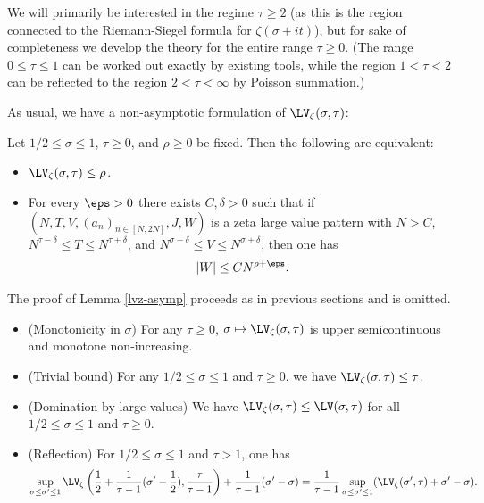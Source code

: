 
We will primarily be interested in the regime $\tau \geq 2$ (as this is the region connected to the Riemann-Siegel formula for $\zeta(\sigma+it)$), but for sake of completeness we develop the theory for the entire range $\tau \geq 0$.  (The range $0 \leq \tau \leq 1$ can be worked out exactly by existing tools, while the region $1 < \tau < 2$ can be reflected to the region $2 < \tau < \infty$ by Poisson summation.)

As usual, we have a non-asymptotic formulation of $\LV_\zeta(\sigma,\tau)$:

\begin{lemma}\label{lvz-asymp} Let $1/2 \leq \sigma \leq 1$, $\tau \geq 0$, and $\rho \geq 0$  be fixed.  Then the following are equivalent:
    \begin{itemize}
        \item[(i)] $\LV_\zeta(\sigma,\tau) \leq \rho$.
        \item[(ii)] For every $\eps>0$ there exists $C,\delta>0$ such that if $(N,T,V,(a_n)_{n \in [N,2N]},J,W)$ is a zeta large value pattern with $N > C$, $N^{\tau-\delta} \leq T \leq N^{\tau+\delta}$, and $N^{\sigma-\delta} \leq V \leq N^{\sigma+\delta}$, then one has
              $$ |W| \leq C N^{\rho+\eps}.$$
    \end{itemize}
\end{lemma}

The proof of Lemma \ref{lvz-asymp} proceeds as in previous sections and is omitted.

\begin{lemma}\label{lvz-basic}
    \begin{itemize}
        \item[(i)] (Monotonicity in $\sigma$) For any $\tau \geq 0$, $\sigma \mapsto \LV_\zeta(\sigma,\tau)$ is upper semicontinuous and monotone non-increasing.
        \item[(ii)] (Trivial bound) For any $1/2 \leq \sigma \leq 1$ and $\tau \geq 0$, we have $\LV_\zeta(\sigma,\tau) \leq \tau$.
        \item[(iii)] (Domination by large values)  We have $\LV_\zeta(\sigma,\tau) \leq \LV(\sigma,\tau)$ for all $1/2 \leq \sigma \leq 1$ and $\tau \geq 0$.
        \item[(iv)] (Reflection) For $1/2 \leq \sigma \leq 1$ and $\tau > 1$, one has
              $$ \sup_{\sigma \leq \sigma' \leq 1} \LV_\zeta\left(\frac{1}{2} + \frac{1}{\tau-1} (\sigma'-\frac{1}{2}), \frac{\tau}{\tau-1}\right) + \frac{1}{\tau-1} (\sigma'-\sigma) = \frac{1}{\tau-1} \sup_{\sigma \leq \sigma' \leq 1} (\LV_\zeta(\sigma',\tau) + \sigma'-\sigma).$$
    \end{itemize}
\end{lemma}

